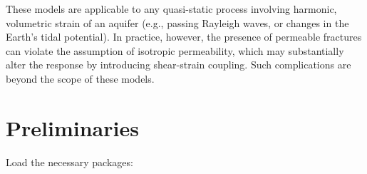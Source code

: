 \documentclass[12pt]{article}\usepackage[]{graphicx}\usepackage[]{color}
\begin{document}
 These models are applicable to any quasi-static process involving harmonic, 
 volumetric strain of an aquifer 
 (e.g., passing Rayleigh waves, or changes in the Earth's tidal potential). 
 In practice, however, the presence of permeable fractures can violate the
 assumption of isotropic permeability, which may substantially
 alter the response by introducing shear-strain coupling. Such
 complications are beyond the scope of these models.

\section{Preliminaries}




Load the necessary packages:
\end{document}
